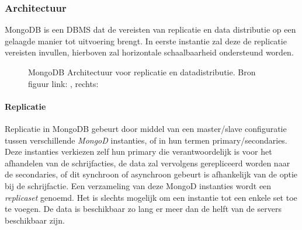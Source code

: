 \subsubsection{Architectuur}
MongoDB is een DBMS dat de vereisten van replicatie en data distributie op een gelaagde manier tot uitvoering brengt. In eerste instantie zal deze de replicatie vereisten invullen, hierboven zal horizontale schaalbaarheid ondersteund worden. 

\begin{figure}[ht!] 
\centering
	\hfill
	\caption{MongoDB Architectuur voor replicatie en datadistributie. Bron figuur link: \cite{mongodb-replicaset}, rechts: \cite{mongodb-shard}}
	\label{fig:mongodb-architectuur}
\end{figure}

\paragraph{Replicatie\cite{mongodb-replicaset}} Replicatie in MongoDB gebeurt door middel van een master/slave configuratie tussen verschillende \textit{MongoD} instanties, of in hun termen primary/secondaries. Deze instanties verkiezen zelf hun primary die verantwoordelijk is voor het afhandelen van de schrijfacties, de data zal vervolgens gerepliceerd worden naar de secondaries, of dit synchroon of asynchroon gebeurt is afhankelijk van de optie bij de schrijfactie. Een verzameling van deze MongoD instanties wordt een \textit{replicaset} genoemd. Het is slechts mogelijk om een instantie tot een enkele set toe te voegen. De data is beschikbaar zo lang er meer dan de helft van de servers beschikbaar zijn. 


